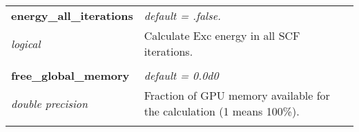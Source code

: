 \begin{Spacing}{1.0}
\begin{longtable}{ p{} p{} }
   \textbf{energy\_all\_iterations}
   &  \textit{default = .false. }
   \\*\textit{logical}
   & Calculate Exc energy in all SCF iterations.\\* \\

   \textbf{free\_global\_memory}
   &  \textit{default = 0.0d0}
   \\*\textit{double precision}
   & Fraction of GPU memory available for the calculation
   (1 means 100\%).\\* \\


\end{longtable}
\end{Spacing}
